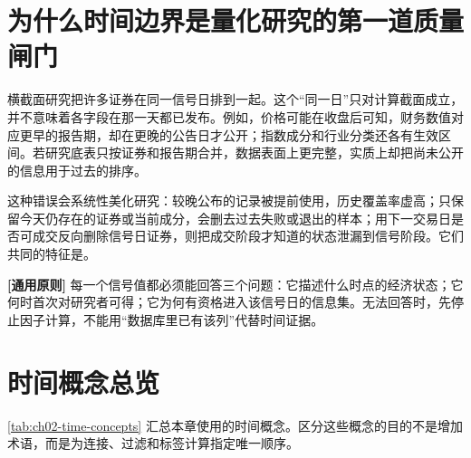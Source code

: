 \section{为什么时间边界是量化研究的第一道质量闸门}

横截面研究把许多证券在同一信号日排到一起。这个“同一日”只对计算截面成立，并不意味着各字段在那一天都已发布。例如，价格可能在收盘后可知，财务数值对应更早的报告期，却在更晚的公告日才公开；指数成分和行业分类还各有生效区间。若研究底表只按证券和报告期合并，数据表面上更完整，实质上却把尚未公开的信息用于过去的排序。

这种错误会系统性美化研究：较晚公布的记录被提前使用，历史覆盖率虚高；只保留今天仍存在的证券或当前成分，会删去过去失败或退出的样本；用下一交易日是否可成交反向删除信号日证券，则把成交阶段才知道的状态泄漏到信号阶段。它们共同的特征是。

\begin{principlebox}
\textbf{[通用原则]} 每一个信号值都必须能回答三个问题：它描述什么时点的经济状态；它何时首次对研究者可得；它为何有资格进入该信号日的信息集。无法回答时，先停止因子计算，不能用“数据库里已有该列”代替时间证据。
\end{principlebox}

\section{时间概念总览}

\cref{tab:ch02-time-concepts} 汇总本章使用的时间概念。区分这些概念的目的不是增加术语，而是为连接、过滤和标签计算指定唯一顺序。

